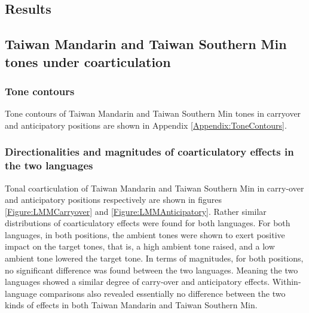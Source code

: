\documentclass[12pt]{report}
\begin{document}
\begin{CJK}{UTF8}{bsmi}
\pagebreak
\chapter{Results}
\section{Taiwan Mandarin and Taiwan Southern Min tones under coarticulation}

\subsection{Tone contours}

Tone contours of Taiwan Mandarin and Taiwan Southern Min tones in carryover and anticipatory positions are shown in Appendix \ref{Appendix:ToneContours}.

\subsection{Directionalities and magnitudes of coarticulatory effects in the two languages}

Tonal coarticulation of Taiwan Mandarin and Taiwan Southern Min in carry-over and anticipatory positions respectively are shown in figures \ref{Figure:LMMCarryover} and \ref{Figure:LMMAnticipatory}. Rather similar distributions of coarticulatory effects were found for both languages. For both languages, in both positions, the ambient tones were shown to exert positive impact on the target tones, that is, a high ambient tone raised, and a low ambient tone lowered the target tone. In terms of magnitudes, for both positions, no significant difference was found between the two languages. Meaning the two languages showed a similar degree of carry-over and anticipatory effects. Within-language comparisons also revealed essentially no difference between the two kinds of effects in both Taiwan Mandarin and Taiwan Southern Min.


\end{CJK}
\end{document}
